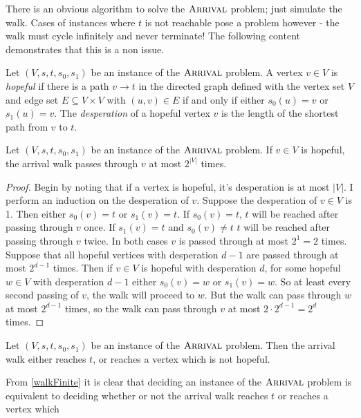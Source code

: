 There is an obvious algorithm to solve the $\textsc{Arrival}$ problem;
just simulate the walk. Cases of instances where $t$ is not reachable pose a problem however -
the walk must cycle infinitely and never terminate!
The following content demonstrates that this is a non issue.
\begin{definition}
  Let $(V, s, t, s_0, s_1)$ be an instance of the $\textsc{Arrival}$ problem. A vertex $v \in V$
  is \emph{hopeful} if there is a path $v \to t$ in the directed graph defined with
  the vertex set $V$ and edge set $E \subseteq V \times V$ with $(u, v) \in E$ if and
  only if either $s_0(u) = v$ or $s_1(u) = v$. The \emph{desperation} of a hopeful vertex
  $v$ is the length of the shortest path from $v$ to $t$.
\end{definition}
\begin{lemma}
  Let $(V, s, t, s_0, s_1)$  be an instance of the $\textsc{Arrival}$ problem. If $v \in V$ is hopeful,
  the arrival walk passes through $v$ at most $2^{|V|}$ times.
\end{lemma}
\begin{proof}
  Begin by noting that if a vertex is hopeful, it's desperation is at most $|V|$. I perform
  an induction on the desperation of $v$. Suppose the desperation of $v \in V$ is 1. Then either
  $s_0(v) = t$ or $s_1(v) = t$. If $s_0(v) = t$, $t$ will be reached after passing through $v$ once.
  If $s_1(v) = t$ and $s_0(v) \neq t$ $t$ will be reached after passing through $v$ twice. In
  both cases $v$ is passed through at most $2^1 = 2$ times. \\
  Suppose that all hopeful vertices with desperation $d - 1$ are passed through at most $2^{d-1}$ times.
  Then if $v \in V$ is hopeful with desperation $d$, for some hopeful $w \in V$ with desperation
  $d - 1$ either $s_0(v) = w$ or $s_1(v) = w$. So at least every second passing of $v$, the
  walk will proceed to $w$. But the walk can pass through $w$ at most $2^{d-1}$ times,
  so the walk can pass through $v$ at most $2 \cdot 2^{d - 1} = 2^d$ times.
\end{proof}
\begin{cor}\label{walkFinite}
  Let $(V, s, t, s_0, s_1)$ be an instance of the $\textsc{Arrival}$ problem. Then the arrival
  walk either reaches $t$, or reaches a vertex which is not hopeful.
\end{cor}
From \cref{walkFinite} it is clear that deciding an instance of the $\textsc{Arrival}$ problem is
equivalent to deciding whether or not the arrival walk reaches $t$ or reaches a vertex which
